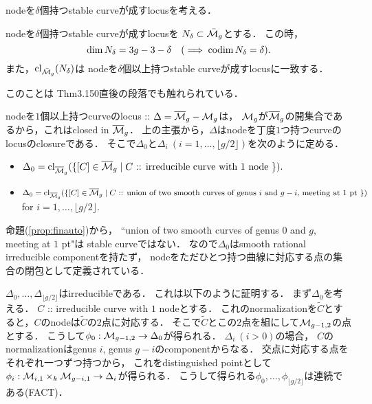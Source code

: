 \documentclass[a4paper]{jsarticle}
\begin{document}
    nodeを$\delta$個持つstable curveが成すlocusを考える．
    \begin{Claim}
        nodeを$\delta$個持つstable curveが成すlocusを
        $N_{\delta} \subset \bar{\mathcal{M}}_g$とする．
        この時，
        \[ \dim N_{\delta}=3g-3-\delta \quad (\implies \operatorname{codim} N_{\delta}=\delta). \]
        また，$\operatorname{cl}_{\bar{\mathcal{M}}_g}(N_{\delta})$は
        nodeを$\delta$個以上持つstable curveが成すlocusに一致する．
    \end{Claim}
    このことは\cite{HaMo} Thm3.150直後の段落でも触れられている．

    nodeを$1$個以上持つcurveのlocus :: $\Delta=\overline{\mathcal{M}}_g-\mathcal{M}_g$は，
    $\mathcal{M}_g$が$\overline{\mathcal{M}}_g$の開集合であるから，これはclosed in $\overline{\mathcal{M}}_g$．
    上の主張から，$\Delta$はnodeを丁度$1$つ持つcurveのlocusのclosureである．
    そこで$\Delta_0$と$\Delta_i \ (i=1,\dots,\lfloor g/2\rfloor)$を次のように定める．
    \begin{itemize}
        \item $\Delta_0=\operatorname{cl}_{\overline{\mathcal{M}}_g}(\{ [C] \in \overline{\mathcal{M}}_g \mid
                C \text{ :: irreducible curve with $1$ node } \}).$
        \item $\Delta_0=\operatorname{cl}_{\overline{\mathcal{M}}_g}(\{ [C] \in \overline{\mathcal{M}}_g \mid
                C \text{ :: union of two smooth curves of genus $i$ and $g-i$, meeting at $1$ pt } \})$
                for $i=1,\dots,\lfloor g/2\rfloor.$
    \end{itemize}
    \begin{Remark}
        命題(\ref{prop:finauto})から，
        ``union of two smooth curves of genus $0$ and $g$, meeting at $1$ pt"は
        stable curveではない．
        なので$\Delta_0$はsmooth rational irreducible componentを持たず，
        nodeをただひとつ持つ曲線に対応する点の集合の閉包として定義されている．
    \end{Remark}

    $\Delta_0,\dots,\Delta_{\lfloor g/2 \rfloor}$はirreducibleである．
    これは以下のように証明する．
    まず$\Delta_0$を考える．
    $C$ :: irreducible curve with $1$ nodeとする．
    これのnormalizationを$\tilde{C}$とすると，$C$のnodeは$\tilde{C}$の$2$点に対応する．
    そこで$\tilde{C}$とこの$2$点を組にして$\mathcal{M}_{g-1,2}$の点とする．
    こうして$\phi_0: \mathcal{M}_{g-1, 2} \to \Delta_0$が得られる．
    $\Delta_i \ (i>0)$の場合，
    $C$のnormalizationはgenus $i$, genus $g-i$のcomponentからなる．
    交点に対応する点をそれぞれ一つずつ持つから，
    これをdistinguished pointとして
    $\phi_i: \mathcal{M}_{i, 1} \times_k \mathcal{M}_{g-i, 1} \to \Delta_i$が得られる．
    こうして得られる$\phi_0,\dots,\phi_{\lfloor g/2 \rfloor}$は連続である(FACT)．
    
\end{document}
